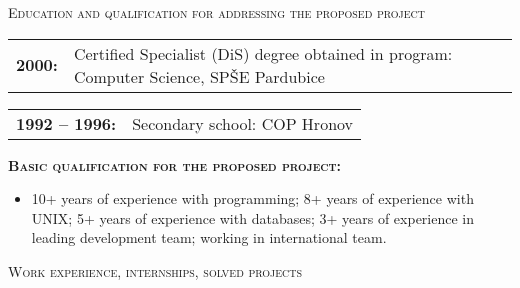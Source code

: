 \begin{cv}
\begin{cvlist}{\large \textsc{Education and qualification for addressing the proposed project}}

  \item \begin{tabular}{p{2.8cm}p{11cm}} {\bf{2000:}} & Certified
    Specialist (DiS) degree obtained in program: Computer Science,
    SPŠE Pardubice
  \end{tabular}


  \item \begin{tabular}{p{2.8cm}p{11cm}}
   {\bf{1992 -- 1996:}} & Secondary school: COP Hronov
   \end{tabular}
   
   \item {\bf{\textsc{Basic qualification for the proposed
         project:}}} \begin{itemize}
    \item[] \vspace{-0.3cm} 10+ years of experience with programming; 8+
      years of experience with UNIX; 5+ years of experience with
      databases; 3+ years of experience in leading development team;
      working in international team.

   \end{itemize}  
\end{cvlist}






\noindent\hrulefill
\begin{cvlist}{\large \textsc{Work experience, internships, solved projects}}


\end{cvlist}
\end{cv}
